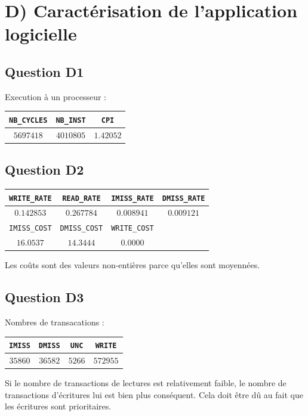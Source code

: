 \documentclass[10pt]{article}
\begin{document}
\newpage

\section{D) Caractérisation de l'application logicielle}
\subsection{Question D1}
Execution à un processeur :
\begin{center}
  \begin{tabular}{|c|c|c|}
    \hline
    \texttt{NB\_CYCLES} & \texttt{NB\_INST} & \texttt{CPI} \\ \hline
    $5697418$ & $4010805$ & $1.42052$ \\ \hline
  \end{tabular}
\end{center}

\subsection{Question D2}
\begin{center}
  \begin{tabular}{|c|c|c|c|}
    \hline
    \texttt{WRITE\_RATE} & \texttt{READ\_RATE} & \texttt{IMISS\_RATE} & \texttt{DMISS\_RATE} \\ \hline
    $0.142853$ & $0.267784$ & $0.008941$ & $0.009121$ \\ \hline
    \texttt{IMISS\_COST} & \texttt{DMISS\_COST} & \texttt{WRITE\_COST} & \\ \hline
    $16.0537$ & $14.3444$ & $0.0000$ & \\ \hline
  \end{tabular}
\end{center}
Les coûts sont des valeurs non-entières parce qu'elles sont moyennées.

\subsection{Question D3}
Nombres de transacations :
\begin{center}
  \begin{tabular}{|c|c|c|c|}
    \hline
    \texttt{IMISS} & \texttt{DMISS} & \texttt{UNC} & \texttt{WRITE} \\ \hline
    $35860$ & $36582$ & $5266$ & $572955$ \\ \hline
  \end{tabular}
\end{center}
Si le nombre de transactions de lectures est relativement faible, le nombre de
transactions d'écritures lui est bien plus conséquent. Cela doit être dû au
fait que les écritures sont prioritaires.
\end{document}
